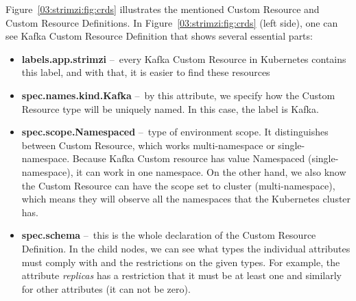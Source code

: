 Figure~\ref{03:strimzi:fig:crds} illustrates the mentioned Custom Resource and Custom Resource Definitions.
In Figure~\ref{03:strimzi:fig:crds} (left side), one can see Kafka Custom Resource Definition that shows several essential parts:
\begin{itemize}[itemsep=1mm, parsep=0pt]
    \item \textbf{labels.app.strimzi}  \---\ every Kafka Custom Resource in Kubernetes contains this label, and with that, it is easier to find these resources
    \item \textbf{spec.names.kind.Kafka} \---\ by this attribute, we specify how the Custom Resource type will be uniquely named.
    In this case, the label is Kafka.
    \item \textbf{spec.scope.Namespaced} \---\ type of environment scope.
    It distinguishes between Custom Resource, which works multi-namespace or single-namespace.
    Because Kafka Custom resource has value Namespaced (single-namespace), it can work in one namespace.
    On the other hand, we also know the Custom Resource can have the scope set to cluster (multi-namespace), which means they will observe all the namespaces that the Kubernetes cluster has.
    \item \textbf{spec.schema} \---\ this is the whole declaration of the Custom Resource Definition.
    In the child nodes, we can see what types the individual attributes must comply with and the restrictions on the given types.
    For example, the attribute \emph{replicas} has a restriction that it must be at least one and similarly for other attributes (it can not be zero).
\end{itemize}

